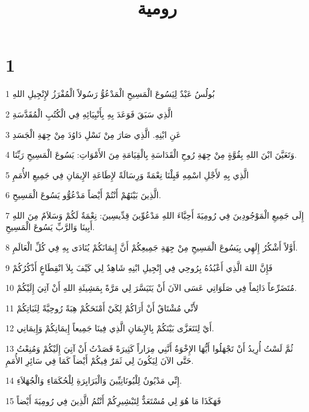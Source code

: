 

\title{رومية}


\chapter{1}

\par 1 بُولُسُ عَبْدٌ لِيَسُوعَ الْمَسِيحِ الْمَدْعُوُّ رَسُولاً الْمُفْرَزُ لإِنْجِيلِ اللهِ
\par 2 الَّذِي سَبَقَ فَوَعَدَ بِهِ بِأَنْبِيَائِهِ فِي الْكُتُبِ الْمُقَدَّسَةِ
\par 3 عَنِ ابْنِهِ. الَّذِي صَارَ مِنْ نَسْلِ دَاوُدَ مِنْ جِهَةِ الْجَسَدِ
\par 4 وَتَعَيَّنَ ابْنَ اللهِ بِقُوَّةٍ مِنْ جِهَةِ رُوحِ الْقَدَاسَةِ بِالْقِيَامَةِ مِنَ الأَمْوَاتِ: يَسُوعَ الْمَسِيحِ رَبِّنَا.
\par 5 الَّذِي بِهِ لأَجْلِ اسْمِهِ قَبِلْنَا نِعْمَةً وَرِسَالَةً لإِطَاعَةِ الإِيمَانِ فِي جَمِيعِ الأُمَمِ
\par 6 الَّذِينَ بَيْنَهُمْ أَنْتُمْ أَيْضاً مَدْعُوُّو يَسُوعَ الْمَسِيحِ.
\par 7 إِلَى جَمِيعِ الْمَوْجُودِينَ فِي رُومِيَةَ أَحِبَّاءَ اللهِ مَدْعُوِّينَ قِدِّيسِينَ: نِعْمَةٌ لَكُمْ وَسَلاَمٌ مِنَ اللهِ أَبِينَا وَالرَّبِّ يَسُوعَ الْمَسِيحِ.
\par 8 أَوَّلاً أَشْكُرُ إِلَهِي بِيَسُوعَ الْمَسِيحِ مِنْ جِهَةِ جَمِيعِكُمْ أَنَّ إِيمَانَكُمْ يُنَادَى بِهِ فِي كُلِّ الْعَالَمِ.
\par 9 فَإِنَّ اللهَ الَّذِي أَعْبُدُهُ بِرُوحِي فِي إِنْجِيلِ ابْنِهِ شَاهِدٌ لِي كَيْفَ بِلاَ انْقِطَاعٍ أَذْكُرُكُمْ
\par 10 مُتَضَرِّعاً دَائِماً فِي صَلَوَاتِي عَسَى الآنَ أَنْ يَتَيَسَّرَ لِي مَرَّةً بِمَشِيئَةِ اللهِ أَنْ آتِيَ إِلَيْكُمْ.
\par 11 لأَنِّي مُشْتَاقٌ أَنْ أَرَاكُمْ لِكَيْ أَمْنَحَكُمْ هِبَةً رُوحِيَّةً لِثَبَاتِكُمْ
\par 12 أَيْ لِنَتَعَزَّى بَيْنَكُمْ بِالإِيمَانِ الَّذِي فِينَا جَمِيعاً إِيمَانِكُمْ وَإِيمَانِي.
\par 13 ثُمَّ لَسْتُ أُرِيدُ أَنْ تَجْهَلُوا أَيُّهَا الإِخْوَةُ أَنَّنِي مِرَاراً كَثِيرَةً قَصَدْتُ أَنْ آتِيَ إِلَيْكُمْ وَمُنِعْتُ حَتَّى الآنَ لِيَكُونَ لِي ثَمَرٌ فِيكُمْ أَيْضاً كَمَا فِي سَائِرِ الأُمَمِ.
\par 14 إِنِّي مَدْيُونٌ لِلْيُونَانِيِّينَ وَالْبَرَابِرَةِ لِلْحُكَمَاءِ وَالْجُهَلاَءِ.
\par 15 فَهَكَذَا مَا هُوَ لِي مُسْتَعَدٌّ لِتَبْشِيرِكُمْ أَنْتُمُ الَّذِينَ فِي رُومِيَةَ أَيْضاً
